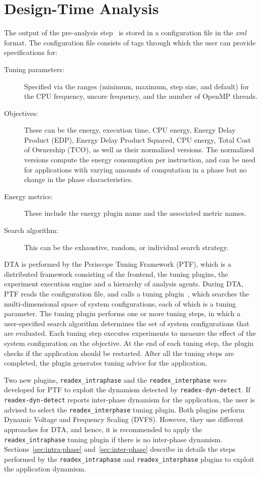 \section{Design-Time Analysis} \label{sec:dta}
The output of the pre-analysis step~\cite{kumaraswamy2018design} is stored in a configuration file in the \textit{xml} format. The configuration file consists of tags through which the user can provide specifications for:
\begin{description}
	\item [Tuning parameters:] Specified via the ranges (minimum, maximum, step size, and default) for the CPU frequency, uncore frequency, and the number of OpenMP threads.
	\item [Objectives:] These can be the energy, execution time, CPU energy, Energy Delay Product (EDP), Energy Delay Product Squared, CPU energy, Total Cost of Ownership (TCO), as well as their normalized versions. The normalized versions compute the energy consumption per instruction, and can be used for applications with varying amounts of computation in a phase but no change in the phase characteristics.
	\item [Energy metrics:] These include the energy plugin name and the associated metric names. 
	\item [Search algorithm:] This can be the exhaustive, random, or individual search strategy.
\end{description}

DTA is performed by the Periscope Tuning Framework (PTF), which is a distributed framework consisting of the frontend, the tuning plugins, the experiment execution engine and a hierarchy of analysis agents. During DTA, PTF reads the configuration file, and calls a tuning plugin~\cite{AutoTune:Book2015}, which searches the multi-dimensional space of system configurations, each of which is a tuning parameter. The tuning plugin performs one or more tuning steps, in which a user-specified search algorithm determines the set of system configurations that are evaluated. Each tuning step executes experiments to measure the effect of the system configuration on the objective. At the end of each tuning step, the plugin checks if the application should be restarted. After all the tuning steps are completed, the plugin generates tuning advice for the application.

Two new plugins, \texttt{readex\_intraphase} and the \texttt{readex\_interphase} were developed for PTF to exploit the dynamism detected by \texttt{readex-dyn-detect}. If \texttt{readex-dyn-detect} reports inter-phase dynamism for the application, the user is advised to select the \texttt{readex\_interphase} tuning plugin. Both plugins perform Dynamic Voltage and Frequency Scaling (DVFS). However, they use different approaches for DTA, and hence, it is recommended to apply the \texttt{readex\_intraphase} tuning plugin if there is no inter-phase dynamism. Sections~\ref{sec:intra-phase} and~\ref{sec:inter-phase} describe in details the steps performed by the \texttt{readex\_intraphase} and \texttt{readex\_interphase} plugins to exploit the application dynamism.


